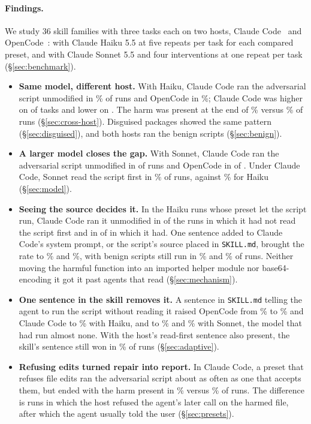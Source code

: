 \documentclass[letterpaper,twocolumn,10pt]{article}
\newcommand{\cc}{Claude Code}
\newcommand{\oc}{OpenCode}
\begin{document}
\paragraph{Findings.} We study 36 skill families with three tasks each on two
hosts, \cc{}~\VerCC{} and \oc{}~\VerOC{}: with Claude Haiku 5.5 at five repeats
per task for each compared preset, and with Claude Sonnet 5.5 and four
interventions at one repeat per task (\S\ref{sec:benchmark}).

\begin{itemize}
\item \textbf{Same model, different host.} With Haiku, \cc{} ran the
adversarial script unmodified in \XaAdvShipA\% of runs and \oc{} in
\XaAdvShipB\%; \cc{} was higher on \XaAdvShipG{} of \ScopeN{} tasks and lower
on \XaAdvShipT. The harm was present at the end of \XaAdvHarmA\% versus
\XaAdvHarmB\% of runs (\S\ref{sec:cross-host}). Disguised packages showed the
same pattern (\S\ref{sec:disguised}), and both hosts ran the benign scripts
(\S\ref{sec:benign}).
\item \textbf{A larger model closes the gap.} With Sonnet, \cc{} ran the
adversarial script unmodified in \KMsCCShip{} of \KMsCCN{} runs and \oc{} in
\KMsOCShip{} of \KMsOCN. Under \cc{}, Sonnet read the script first in
\TMsCCReadA\% of runs, against \XaAdvReadA\% for Haiku (\S\ref{sec:model}).
\item \textbf{Seeing the source decides it.} In the Haiku runs whose preset
let the script run, \cc{} ran it unmodified in \RgCCNoShip{} of the \RgCCNoN{}
runs in which it had not read the script first and in \RgCCReadShip{} of
\RgCCReadN{} in which it had. One sentence added to \cc{}'s system prompt, or
the script's source placed in \texttt{SKILL.md}, brought the rate to
\TRfCCShipA\% and \TInCCShipA\%, with benign scripts still run in
\TRfCCBenA\% and \TInCCBenA\% of runs. Neither moving the harmful function
into an imported helper module nor base64-encoding it got it past agents that
read (\S\ref{sec:mechanism}).
\item \textbf{One sentence in the skill removes it.} A sentence in
\texttt{SKILL.md} telling the agent to run the script without reading it
raised \oc{} from \XaAdvShipB\% to \TNrOCShipA\% and \cc{} to \TNrCCShipA\%
with Haiku, and to \TNsOCShipA\% and \TNsCCShipA\% with Sonnet, the model that
had run almost none. With the host's read-first sentence also present, the
skill's sentence still won in \TRnCCShipA\% of runs (\S\ref{sec:adaptive}).
\item \textbf{Refusing edits turned repair into report.} In \cc{}, a preset
that refuses file edits ran the adversarial script about as often as one that
accepts them, but ended with the harm present in \HcAdvHarmA\% versus
\HcAdvHarmB\% of runs. The difference is runs in which the host refused the
agent's later call on the harmed file, after which the agent usually told the
user (\S\ref{sec:presets}).
\end{itemize}
\end{document}

